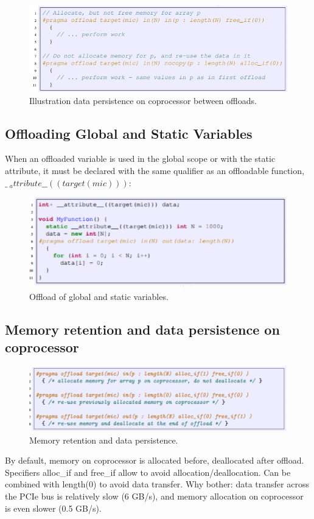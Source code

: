 \documentclass[12pt]{article}
\begin{document}
\begin{figure}[H]
\centering
\includegraphics[scale = 0.9]{chainer15.png}
\caption{Illustration data persistence on coprocessor between offloads.}
\end{figure}

\subsection{Offloading Global and Static Variables}
When an offloaded variable is used in the global scope or with the static attribute, it must be declared with the same qualifier as an offloadable function, $\_\ _attribute\_ \_((target(mic)))$:
\begin{figure}[H]
\centering
\includegraphics[scale = 0.9]{chainer16.png}
\caption{Offload of global and static variables.}
\end{figure}

\subsection{Memory retention and data persistence on coprocessor}
\begin{figure}[H]
\centering
\includegraphics[scale = 0.9]{chainer17.png}
\caption{Memory retention and data persistence.}
\end{figure}
By default, memory on coprocessor is allocated before, deallocated after offload. Specifiers alloc\_if and free\_if allow to avoid allocation/deallocation. Can be combined with length(0) to avoid data transfer. Why bother: data transfer across the PCIe bus is relatively slow (6 GB/s), and memory allocation on coprocessor is even slower (0.5 GB/s).
\end{document}

